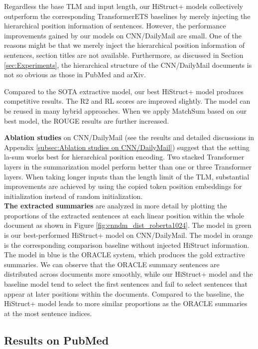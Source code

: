 \documentclass[11pt]{article}
\begin{document}
Regardless the base TLM and input length, our HiStruct+ models collectively outperform the corresponding TransformerETS baselines by merely injecting the hierarchical position information of sentences. 
However, the performance improvements gained by our models on CNN/DailyMail are small. One of the reasons might be that we merely inject the hierarchical position information of sentences, section titles are not available. Furthermore, as discussed in Section \ref{sec:Experiments}, the hierarchical structure of the CNN/DailyMail documents is not so obvious as those in PubMed and arXiv. 

Compared to the SOTA extractive model, our best HiStruct+ model produces competitive results. The R2 and RL scores are improved slightly. 
The model can be reused in many hybrid approaches. When we apply MatchSum based on our best model, the ROUGE results are further increased.


\textbf{Ablation studies} on CNN/DailyMail (see the  results and detailed discussions in Appendix \ref{subsec:Ablation studies on CNN/DailyMail}) suggest that the setting la-sum works best for hierarchical position encoding. Two stacked Transformer layers in the summarization model perform better than one or three Transformer layers. When taking longer inputs than the length limit of the TLM, substantial improvements are achieved by using the copied token position embeddings for initialization instead of random initialization. 
\\
\indent
\textbf{The extracted summaries} are analyzed in more detail by plotting the proportions of the extracted sentences at each linear position within the whole document as shown in Figure \ref{fig:cnndm_dist_roberta1024}. The model in green is our best-performed HiStruct+ model on CNN/DailyMail. The model in orange is the corresponding comparison baseline without injected HiStruct information. The model in blue is the ORACLE system, which produces the gold extractive summaries. We can observe that the ORACLE summary sentences are distributed across documents more smoothly, while our HiStruct+ model and the baseline model tend to select the first sentences and fail to select sentences that appear at later positions within the documents. Compared to the baseline, the HiStruct+ model leads to more similar proportions as the ORACLE summaries at the most sentence indices.

\subsection{Results on PubMed}
\label{subsec:Results on PubMed}
\end{document}
